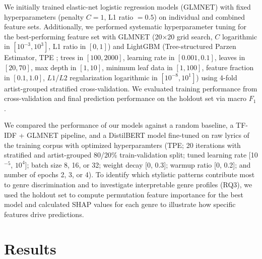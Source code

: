 \documentclass{article}
\begin{document}
We initially trained elastic-net logistic regression models (GLMNET) \cite{defazioSAGAFastIncremental2014} with fixed hyperparameters (penalty $C=1$, L1 ratio $=0.5$) on individual and combined feature sets. Additionally, we performed systematic hyperparameter tuning for the best-performing feature set with GLMNET (20×20 grid search, $C$ logarithmic in $[10^{-3},10^{3}]$, L1 ratio in $[0,1]$) and LightGBM \cite{keLightGBMHighlyEfficient2017a} (Tree-structured Parzen Estimator, TPE \cite{optuna2019}; trees in $[100,2000]$, learning rate in $[0.001,0.1]$, leaves in $[20,70]$, max depth in $[1,10]$, minimum leaf data in $[1,100]$, feature fraction in $[0.1,1.0]$, $L1$/$L2$ regularization logarithmic in $[10^{-8},10^{1}]$) using 4-fold artist-grouped stratified cross-validation. We evaluated training performance from cross-validation and final prediction performance on the holdout set via macro $F_{1}$.

We compared the performance of our models against a random baseline, a TF-IDF \cite{fell2014lyrics} + GLMNET pipeline, and a DistilBERT model \cite{sanhDistilBERTDistilledVersion2020} fine-tuned on raw lyrics of the training corpus with optimized hyperparamters (TPE; 20 iterations with stratified and artist-grouped 80/20\% train-validation split; tuned learning rate [10$^{-5}$, $10^{4}$]; batch size 8, 16, or 32; weight decay [0, 0.3]; warmup ratio [0, 0.2]; and number of epochs 2, 3, or 4). To identify which stylistic patterns contribute most to genre discrimination and to investigate interpretable genre profiles (RQ3), we used the holdout set to compute permutation feature importance \cite{fisherAllModelsAre2019} for the best  model and calculated SHAP values \cite{lundbergUnifiedApproachInterpreting2017a} for each genre to illustrate how specific features drive predictions.

\section{Results}
\end{document}

